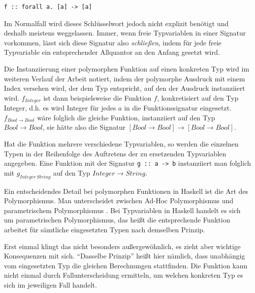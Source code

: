 \begin{verbatim}
f :: forall a. [a] -> [a]
\end{verbatim}

Im Normalfall wird dieses Schlüsselwort jedoch nicht explizit benötigt und deshalb meistens weggelassen. Immer, wenn
freie Typvariablen in einer Signatur vorkommen, lässt sich diese Signatur also \textit{schließen}, indem für jede freie Typvariable
ein entsprechender Allquantor an den Anfang gesetzt wird.

Die Instanziierung einer polymorphen Funktion auf einen konkreten Typ wird im weiteren Verlauf der Arbeit notiert, indem der
polymorphe Ausdruck mit einem Index versehen wird, der dem Typ entspricht, auf den der Ausdruck instanziiert wird.
$f_{Integer}$ ist dann beispielsweise die Funktion $f$, konkretisiert auf den Typ Integer, d.h. es wird Integer
für jedes $a$ in die Funktionssignatur eingesetzt. $f_{Bool \rightarrow Bool}$ wäre folglich die gleiche Funktion, instanziiert auf den Typ
$Bool \rightarrow Bool$, sie hätte also die Signatur $[Bool \rightarrow Bool] \rightarrow [Bool \rightarrow Bool]$.

Hat die Funktion mehrere verschiedene Typvariablen, so werden die einzelnen Typen
in der Reihenfolge des Auftretens der zu ersetzenden Typvariablen angegeben. Eine Funktion mit der Signatur \texttt{g :: a -> b} instanziiert man
folglich mit $g_{Integer\ String}$ auf den Typ $Integer \rightarrow String$.


Ein entscheidendes Detail bei polymorphen Funktionen in Haskell ist die Art des Polymorphismus.
Man unterscheidet zwischen Ad-Hoc Polymorphismus und parametrischem Poly\-mor\-phis\-mus \cite{strachey}. Bei Typvariablen
in Haskell handelt es sich um parametrischen Polymorphismus, das heißt die entsprechende Funktion arbeitet für sämtliche
eingesetzten Typen nach demselben Prinzip.

Erst einmal klingt das nicht besonders außergewöhnlich, es zieht aber wichtige
Konsequenzen mit sich. ``Dasselbe Prinzip'' heißt hier nämlich, dass unabhängig vom eingesetzten Typ die gleichen
Berechnungen stattfinden. Die Funktion kann nicht einmal
durch Fallunterscheidung ermitteln, um welchen konkreten Typ es sich im jeweiligen Fall handelt.

